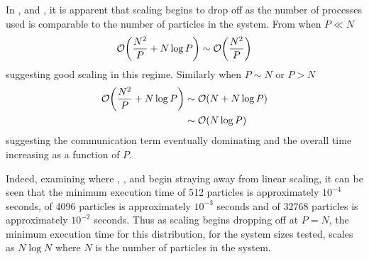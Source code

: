 \begin{figure}[!h]
    
    \caption{}
    \label{fig:v0_replicated_pair_operation_4096_logtime}
\end  {figure}

\begin{figure}[!h]
    
    \caption{}
    \label{fig:v0_replicated_pair_operation_32768_logtime}
\end  {figure}

\vZeroTimeExplanation
    {  }
    {  }
    {  }
    { \pairoperation{} }

In ,
 and
,
it is apparent that scaling begins to drop off as the number
of processes used is comparable to the number of particles in the system.
%
From  when $P \ll{} N$
\begin{equation}
    \mathcal{O}{\left({ \frac{N^2}{P} + N\log{P} }\right)} \sim{} \mathcal{O}{\left({ \frac{N^2}{P} }\right)}
\end  {equation}
suggesting good scaling in this regime.
%
Similarly when $P \sim{} N$
or $P > N$
\begin{align}
    \mathcal{O}{\left({ \frac{N^2}{P} + N\log{P} }\right)}
        &\sim{} \mathcal{O}{\left({ N + N\log{P} }\right)} \\
        &\sim{} \mathcal{O}{\left({ N\log{P} }\right)}
\end  {align}
%
suggesting the communication term eventually dominating and
the overall time increasing as a function of $P$.

Indeed, examining where
,
,
 and
begin straying away from linear scaling,
it can be seen that the minimum execution time
of 512 particles is approximately $10^{-4}$ seconds,
of 4096 particles is approximately $10^{-3}$ seconds and
of 32768 particles is approximately $10^{-2}$ seconds.
%
Thus as scaling begins dropping off at $P = N$,
the minimum execution time for this distribution,
for the system sizes tested,
scales as $N\log{N}$
where $N$ is the number of particles in the system.

